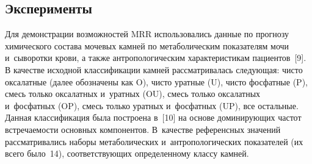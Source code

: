\begin{multicols}{2}
\section{Эксперименты}

\vspace*{-2pt}

     Для демонстрации возможностей MRR использовались данные по 
прогнозу химического состава мочевых камней по метаболическим 
показателям мочи и~сыворотки крови, а также антропологическим 
характеристикам пациентов~[9]. В качестве исходной классификации камней 
рассматривалась следующая: чисто оксалатные (далее обозначены как O), чисто 
уратные (U), чисто фосфатные (P), смесь только оксалатных и~уратных (OU), 
смесь только оксалатных и~фосфатных (OP), смесь только уратных 
и~фосфатных (UP), все остальные. Данная классификация была построена 
в~[10] на основе доминирующих частот встречаемости основных компонентов. 
В~качестве референсных значений рассматривались наборы метаболических 
и~антропологических показателей (их всего было~14), соответствующих 
определенному классу камней.

\begin{table*}\small
\begin{center}



\end{center}
\end{table*}
\end{multicols}
